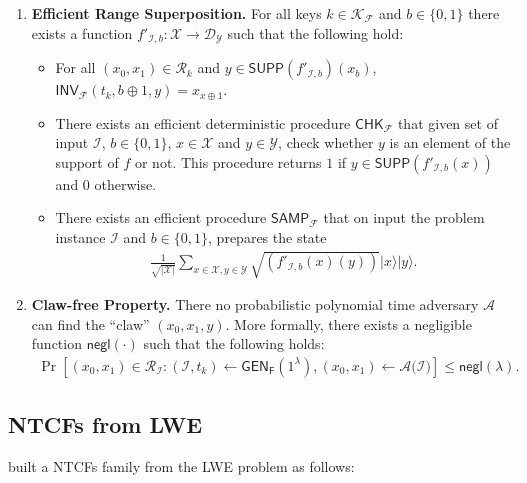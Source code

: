 \documentclass[cryptography,review,submit,pdftex,moreauthors,amsmath,amssymb,aps,strict]{Definitions/mdpi}
\begin{document}
\begin{Definition}
\begin{enumerate}
\begin{itemize}
    \end{itemize}
    \item \textbf{Efficient Range Superposition.} For all keys $k\in \mathcal{K}_{\mathcal{F}}$ and $b\in\{0,1\}$ there exists a function $f'_{\mathcal{I},b}:\mathcal{X}\to \mathcal{D}_{\mathcal{Y}}$ such that the following hold:
    \begin{itemize}
        \item For all $(x_0,x_1)\in \mathcal{R}_k$ and $y\in\mathsf{SUPP}(f'_{\mathcal{I},b})(x_b)$, $\mathsf{INV}_{\mathcal{F}}(t_k,b\oplus 1,y)=x_{x\oplus 1}$.
        \item There exists an efficient deterministic procedure $\mathsf{CHK}_{\mathcal{F}}$ that given set of input $\mathcal{I}$, $b\in\{0,1\}$, $x\in \mathcal{X}$ and $y\in \mathcal{Y}$, check whether $y$ is an element of the support of $f$ or not. This procedure returns $1$ if $y\in \mathsf{SUPP}(f'_{\mathcal{I},b}(x))$ and $0$ otherwise. 
        \item 
        There exists an efficient procedure $\mathsf{SAMP}_{\mathcal{F}}$ that on input the problem instance $\mathcal{I}$ and $b\in\{0,1\}$, prepares the state
        \begin{align}
            \displaystyle{\frac{1}{\sqrt{|\mathcal{X}|}}}\sum_{x\in\mathcal{X},y\in\mathcal{Y}}\sqrt{(f'_{\mathcal{I},b}(x)(y))}|x\rangle|y\rangle.
        \end{align}
    \end{itemize}
    \item \textbf{Claw-free Property.} There no probabilistic polynomial time adversary $\mathcal{A}$ can find the ``claw'' $(x_0,x_1,y)$. More formally, there exists a negligible function $\mathsf{negl}(\cdot)$ such that the following holds:
    \begin{align}
        \Pr[(x_0,x_1)\in\mathcal{R}_{\mathcal{I}}:(\mathcal{I},t_k)\gets \mathsf{GEN}_{\mathsf{F}}(1^{\lambda}),(x_0,x_1)\gets \mathcal{A}(\mathcal{I)}]\leq \mathsf{negl}(\lambda).
    \end{align}
\end{enumerate}
\end{Definition}
\subsection[\appendixname~\thesubsection]{NTCFs from LWE}
\cite{Brakerski18_Interactiveproofofquantumness} built a NTCFs family from the LWE problem as follows:
\end{document}

